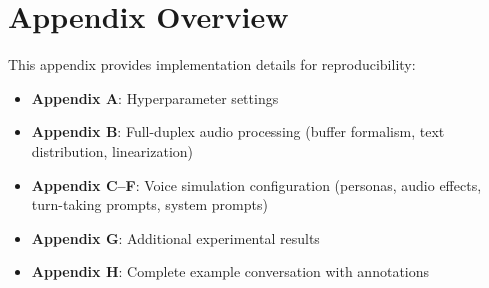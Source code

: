
\section*{Appendix Overview}
This appendix provides implementation details for reproducibility:
\begin{itemize}
    \item \textbf{Appendix A}: Hyperparameter settings
    \item \textbf{Appendix B}: Full-duplex audio processing (buffer formalism, text distribution, linearization)
    \item \textbf{Appendix C--F}: Voice simulation configuration (personas, audio effects, turn-taking prompts, system prompts)
    \item \textbf{Appendix G}: Additional experimental results
    \item \textbf{Appendix H}: Complete example conversation with annotations
\end{itemize}













